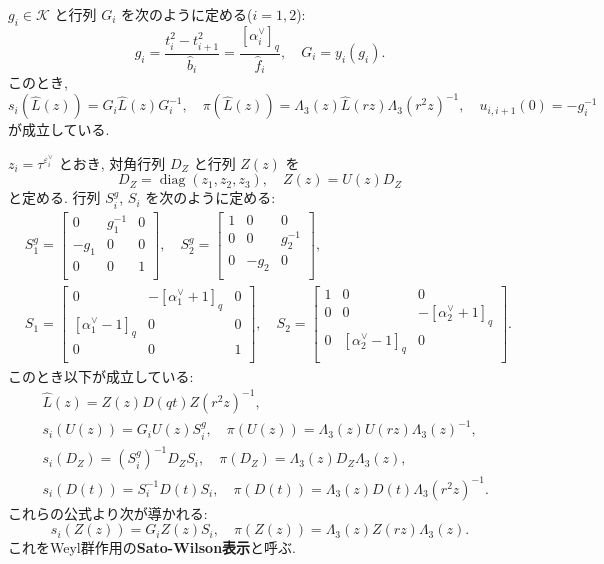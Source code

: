 \documentclass[12pt,twoside,dvipdfm]{msjproc}
\theoremstyle{definition} %
\theoremstyle{definition} %
\theoremstyle{definition} %
\numberwithin{theorem}{section}
\numberwithin{equation}{section}
\numberwithin{figure}{section}
\numberwithin{table}{section}
\newcommand\K{\mathcal{K}}
\newcommand\diag{\mathop{\mathrm{diag}}\nolimits}
\newcommand\hL{{\widehat{L}}}
\newcommand\hb{{\hat{b}}}
\newcommand\hf{{\hat{f}}}
\newcommand\ev{\varepsilon^\vee}
\newcommand\av{\alpha^\vee}
\begin{document}
$g_i\in\K$ と行列 $G_i$ を次のように定める($i=1,2$):
\begin{equation*}
 g_i = \frac{t_i^2-t_{i+1}^2}{\hb_i} = \frac{[\av_i]_q}{\hf_i}, \quad
 G_i = y_i(g_i).
\end{equation*}
このとき,
\begin{equation*}
 s_i(\hL(z)) = G_i \hL(z) G_i^{-1}, \quad
 \pi(\hL(z)) = \Lambda_3(z)\hL(rz)\Lambda_3(r^2z)^{-1}, \quad
 u_{i,i+1}(0) =  -g_i^{-1}
\end{equation*}
が成立している. 

$z_i=\tau^{\ev_i}$ とおき, 対角行列 $D_Z$ と行列 $Z(z)$ を
\begin{equation*}
  D_Z=\diag(z_1,z_2,z_3), \quad Z(z) = U(z)D_Z
\end{equation*} 
と定める. 行列 $S^g_i$, $S_i$ を次のように定める:
\begin{align*}
 &
 S^g_1 =
 \begin{bmatrix}
   0    & g_1^{-1} & 0 \\
   -g_1 & 0        & 0 \\
   0    & 0        & 1 \\
 \end{bmatrix},
 \quad
 S^g_2 =
 \begin{bmatrix}
   1 & 0 & 0 \\
   0 & 0 & g_2^{-1} \\
   0 & -g_2 & 0 \\
 \end{bmatrix},
 \\ &
 S_1 =
 \begin{bmatrix}
   0           & -[\av_1+1]_q & 0 \\
   [\av_1-1]_q & 0        & 0 \\
   0           & 0        & 1 \\
 \end{bmatrix},
 \quad
 S_2 =
 \begin{bmatrix}
   1 & 0           & 0 \\
   0 & 0           & -[\av_2+1]_q \\
   0 & [\av_2-1]_q & 0 \\
 \end{bmatrix}.
\end{align*}
このとき以下が成立している:
\begin{align*}
 &
 \hL(z) = Z(z)D(qt)Z(r^2z)^{-1}, 
 \\ &
 s_i(U(z)) = G_i U(z) S^g_i,  \quad
 \pi(U(z)) = \Lambda_3(z)U(rz)\Lambda_3(z)^{-1}, 
 \\ &
 s_i(D_Z) = (S^g_i)^{-1} D_Z S_i, \quad
 \pi(D_Z) = \Lambda_3(z) D_Z \Lambda_3(z),
 \\ &
 s_i(D(t)) = S_i^{-1} D(t) S_i, \quad
 \pi(D(t)) = \Lambda_3(z)D(t)\Lambda_3(r^2z)^{-1}.
\end{align*}
これらの公式より次が導かれる:
\begin{equation*}
 s_i(Z(z)) = G_i Z(z) S_i, \quad
 \pi(Z(z)) = \Lambda_3(z) Z(rz) \Lambda_3(z).
\end{equation*}
これをWeyl群作用の{\bf Sato-Wilson表示}と呼ぶ.
\end{document}

